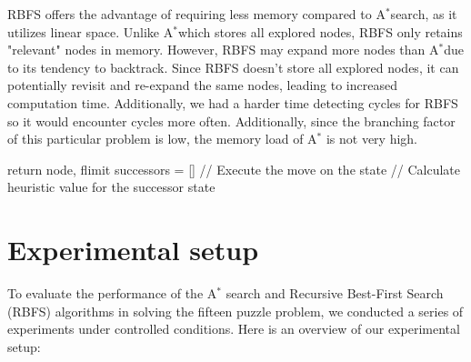 \documentclass{article}
\begin{document}
RBFS offers the advantage of requiring less memory compared to A$^*$search, as it utilizes linear space. Unlike A$^*$which stores all explored nodes, RBFS only retains "relevant" nodes in memory. However, RBFS may expand more nodes than A$^*$due to its tendency to backtrack. Since RBFS doesn't store all explored nodes, it can potentially revisit and re-expand the same nodes, leading to increased computation time. Additionally, we had a harder time detecting cycles for RBFS so it would encounter cycles more often. Additionally, since the branching factor of this particular problem is low, the memory load of A$^*$ is not very high.
\begin{algorithm}
   \begin{algorithmic}
  \State return node, flimit
        \EndIf
        \State successors = []
             // Execute the move on the state
             // Calculate heuristic value for the successor state
            \EndIf
            \EndFor
        \EndIf

            \EndIf
            \EndIf
          \EndWhile
          \end{algorithmic}
  \label{alg:RBFS}
\end{algorithm}

\section{Experimental setup}

To evaluate the performance of the A$^*$ search and Recursive Best-First Search (RBFS) algorithms in solving the fifteen puzzle problem, we conducted a series of experiments under controlled conditions. Here is an overview of our experimental setup:
\end{document}
